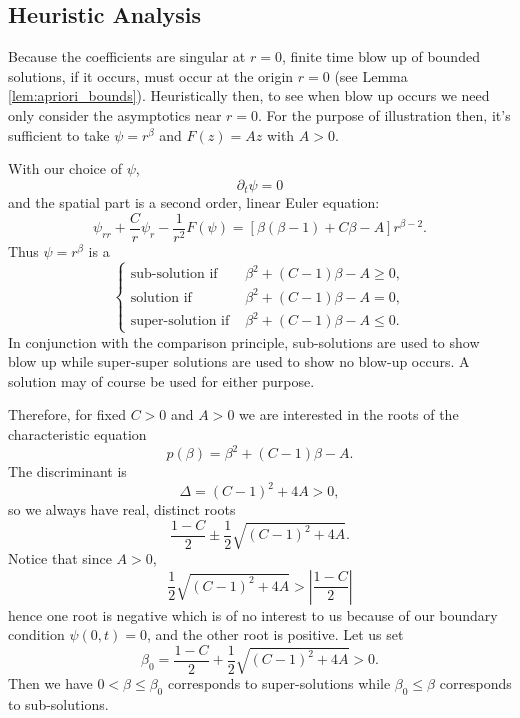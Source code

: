 \documentclass{amsart}
\begin{document}
\subsection{Heuristic Analysis}

Because the coefficients are singular at \(r=0\), finite time blow up of bounded solutions, if it occurs, must occur at the origin \(r = 0\) (see Lemma \ref{lem:apriori_bounds}). Heuristically then, to see when blow up occurs we need only consider the asymptotics near \(r = 0\). For the purpose of illustration then, it's sufficient to take \(\psi = r^{\beta}\) and \(F(z) = A z\) with \(A > 0\).

With our choice of \(\psi\),
\[
\partial_t \psi = 0
\]
and the spatial part is a second order, linear Euler equation:
\[
\psi_{rr} + \frac{C}{r} \psi_r - \frac{1}{r^2} F(\psi) = \left[\beta(\beta-1) + C \beta - A\right]r^{\beta-2}.
\]
Thus \(\psi = r^{\beta}\) is a
\begin{equation}
\label{eq:betasubsuper}
\begin{cases}
\text{sub-solution if } & \beta^2 + (C - 1) \beta - A \geq 0, \\
\text{solution if } & \beta^2 + (C - 1) \beta - A = 0, \\
\text{super-solution if } & \beta^2 + (C - 1) \beta - A \leq 0.
\end{cases}
\end{equation}
In conjunction with the comparison principle, sub-solutions are used to show blow up while super-super solutions are used to show no blow-up occurs. A solution may of course be used for either purpose.

Therefore, for fixed \(C > 0\) and \(A > 0\) we are interested in the roots of the characteristic equation
\begin{equation}
\label{eq:char_poly}
p(\beta) = \beta^2 + (C - 1) \beta - A.
\end{equation}
The discriminant is
\[
\Delta = (C-1)^2 + 4 A > 0,
\]
so we always have real, distinct roots
\[
\frac{1 - C}{2} \pm \frac{1}{2} \sqrt{(C-1)^2 + 4 A}.
\]
Notice that since \(A > 0\),
\[
\frac{1}{2} \sqrt{(C-1)^2 + 4 A} > \left|\frac{1-C}{2}\right|
\]
hence one root is negative which is of no interest to us because of our boundary condition \(\psi(0, t) = 0\), and the other root is positive. Let us set
\[
\beta_0 = \frac{1 - C}{2} + \frac{1}{2} \sqrt{(C-1)^2 + 4 A} > 0.
\]
Then we have \(0 < \beta \leq \beta_0\) corresponds to super-solutions while \(\beta_0 \leq \beta\) corresponds to sub-solutions.
\end{document}
